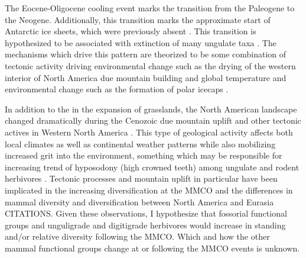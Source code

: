 \documentclass[12pt,letterpaper]{article}
\begin{document}
The Eocene-Oligocene cooling event marks the transition from the Paleogene to the Neogene. Additionally, this transition marks the approximate start of Antarctic ice sheets, which were previously absent \citep{Zachos2008}. This transition is hypothesized to be associated with extinction of many ungulate taxa \citep{Janis2008a}. The mechanisms which drive this pattern are theorized to be some combination of tectonic activity driving environmental change such as the drying of the western interior of North America due mountain building and global temperature and environmental change such as the formation of polar icecaps \citep{Janis2008a,Eronen2015,Blois2009,Badgley2017}. 

In addition to the in the expansion of grasslands, the North American landscape changed dramatically during the Cenozoic due mountain uplift and other tectonic actives in Western North America \citep{Blois2009,Eronen2015,Janis2008a,Badgley2013,Badgley2014,Badgley2017}. This type of geological activity affects both local climates as well as continental weather patterns while also mobilizing increased grit into the environment, something which may be responsible for increasing trend of hyposodony (high crowned teeth) among ungulate and rodent herbivores \citep{Janis1993b,Jardine2012,Jernvall2002,Damuth2011}. Tectonic processes and mountain uplift in particular have been implicated in the increasing diversification at the MMCO \citep{Badgley2013,Janis2008a,Badgley2014,Badgley2010,Finarelli2010} and the differences in mammal diversity and diversification between North America and Eurasia CITATIONS. Given these observations, I hypothesize that fossorial functional groups and unguligrade and digitigrade herbivores would increase in standing and/or relative diversity following the MMCO. Which and how the other mammal functional groups change at or following the MMCO events is unknown.

\end{document}
